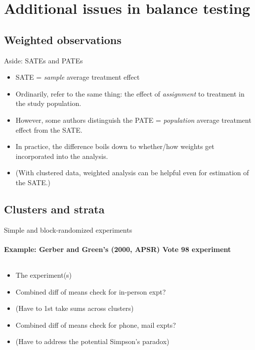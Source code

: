 

\section{Additional issues in balance testing}

\subsection{Weighted observations}
\begin{frame}{Aside: SATEs and PATEs}

  \begin{itemize}
  \item SATE = \textit{sample} average treatment effect
  \item Ordinarily, refer to the same thing: the effect of \textit{assignment} to treatment in the study population.
  \item However, some authors distinguish the PATE =
    \textit{population} average treatment effect from the SATE.
  \item In practice, the difference boils down to whether/how weights get
    incorporated into the analysis.
  \item (With clustered data, weighted analysis can be helpful even
    for estimation of the SATE.)
  \end{itemize}

\end{frame}

\subsection{Clusters and strata}
\begin{frame}{Simple and block-randomized experiments}
\framesubtitle{Example: Gerber and Green's (2000, APSR) Vote 98
  experiment}

\begin{columns}
  \begin{Column}[.3\textwidth]
    \begin{itemize}[<+->]
    \item The experiment(s)
    \item Combined diff of means check for in-person expt?
    \item (Have to 1st take sums across clusters)
    \item Combined diff of means check for phone, mail  expts?
    \item (Have to address the potential Simpson's paradox)
    \end{itemize}
  \end{Column}
  \begin{Column}[.7\textwidth]
  \end{Column}
\end{columns}
  
\end{frame}


